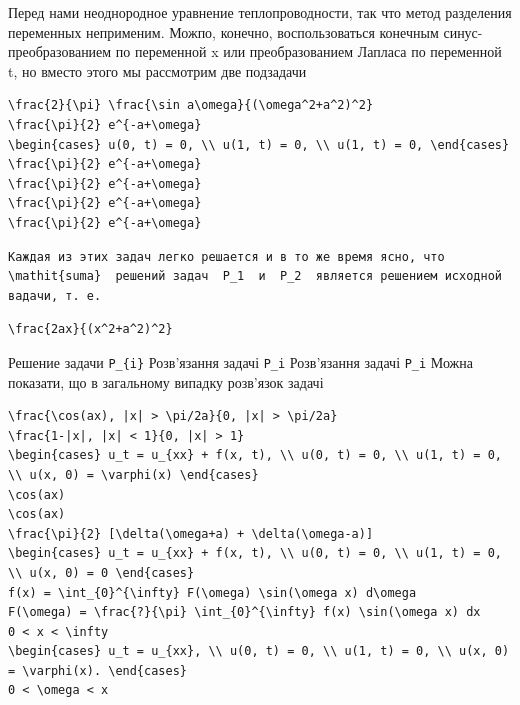 \documentclass[
  ukrainian,
]{article}
\begin{document}
Перед нами неоднородное уравнение теплопроводности, так что метод
разделения переменных неприменим. Можпо, конечно, воспользоваться
конечным синус-преобразованием по переменной x или преобразованием
Лапласа по переменной t, но вместо этого мы рассмотрим две подзадачи

\begin{verbatim}
\frac{2}{\pi} \frac{\sin a\omega}{(\omega^2+a^2)^2}
\frac{\pi}{2} e^{-a+\omega}
\begin{cases} u(0, t) = 0, \\ u(1, t) = 0, \\ u(1, t) = 0, \end{cases}
\frac{\pi}{2} e^{-a+\omega}
\frac{\pi}{2} e^{-a+\omega}
\frac{\pi}{2} e^{-a+\omega}
\frac{\pi}{2} e^{-a+\omega}
\end{verbatim}

\begin{verbatim}
Каждая из этих задач легко решается и в то же время ясно, что  \mathit{suma}  решений задач  P_1  и  P_2  является решением исходной вадачи, т. е.
\end{verbatim}

\begin{verbatim}
\frac{2ax}{(x^2+a^2)^2}
\end{verbatim}

Решение задачи \texttt{P\_\{i\}} Розв'язання задачі \texttt{P\_i}
Розв'язання задачі \texttt{P\_i} Можна показати, що в загальному випадку
розв'язок задачі

\begin{verbatim}
\frac{\cos(ax), |x| > \pi/2a}{0, |x| > \pi/2a}
\frac{1-|x|, |x| < 1}{0, |x| > 1}
\begin{cases} u_t = u_{xx} + f(x, t), \\ u(0, t) = 0, \\ u(1, t) = 0, \\ u(x, 0) = \varphi(x) \end{cases}
\cos(ax)
\cos(ax)
\frac{\pi}{2} [\delta(\omega+a) + \delta(\omega-a)]
\begin{cases} u_t = u_{xx} + f(x, t), \\ u(0, t) = 0, \\ u(1, t) = 0, \\ u(x, 0) = 0 \end{cases}
f(x) = \int_{0}^{\infty} F(\omega) \sin(\omega x) d\omega
F(\omega) = \frac{?}{\pi} \int_{0}^{\infty} f(x) \sin(\omega x) dx
0 < x < \infty
\begin{cases} u_t = u_{xx}, \\ u(0, t) = 0, \\ u(1, t) = 0, \\ u(x, 0) = \varphi(x). \end{cases}
0 < \omega < x
\end{verbatim}
\end{document}
